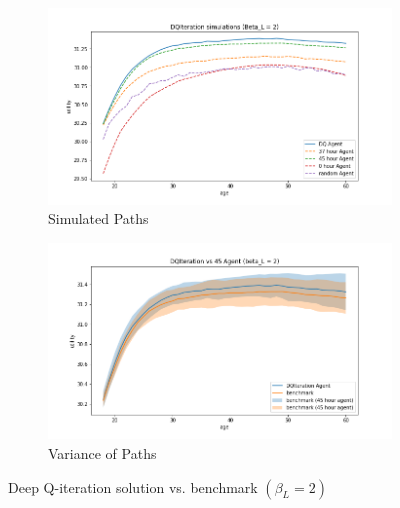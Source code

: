 \begin{figure}[ht]
\begin{subfigure}{.5\textwidth}
  \centering
  \includegraphics[width=1\linewidth]{figures/dqi_model1_beta_2_solution_benchmark_paths.png}
  \caption{Simulated Paths}
  \label{fig:dqi_solution_beta2_path}
\end{subfigure}%
\begin{subfigure}{.5\textwidth}
  \centering
  \includegraphics[width=1\linewidth]{figures/dqi_model1_beta_2_solution_benchmark_variance.png}
  \caption{Variance of Paths}
  \label{fig:dqi_solution_beta2_var}
\end{subfigure}
    \caption{Deep Q-iteration solution vs. benchmark $(\beta_L = 2)$}
    \label{fig:dqi_solution_beta2}
\end{figure}

